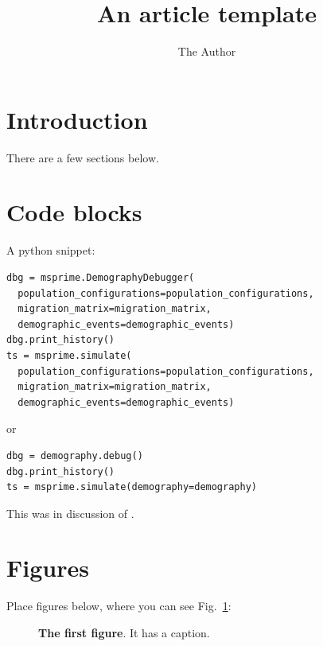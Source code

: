 \documentclass[]{article}
\begin{document}
\title{An article template}
\author[1,*]{The Author}
\maketitle


\section{Introduction}

There are a few sections below.

\lipsum[2-4]

\section{Code blocks}

A python snippet:
\begin{lstlisting}[frame=single]
dbg = msprime.DemographyDebugger(
  population_configurations=population_configurations,
  migration_matrix=migration_matrix,
  demographic_events=demographic_events)
dbg.print_history()
ts = msprime.simulate(
  population_configurations=population_configurations,
  migration_matrix=migration_matrix,
  demographic_events=demographic_events)
\end{lstlisting}
or
\begin{lstlisting}[frame=single]
dbg = demography.debug()
dbg.print_history()
ts = msprime.simulate(demography=demography)
\end{lstlisting}

This was in discussion of \citet{kelleher2016efficient}.
\section{Figures}

Place figures below, where you can see Fig.~\ref{fig:1}:

\begin{figure}[ht]
\begin{center}
\caption{\textbf{The first figure}.
    It has a caption.
}
\label{fig:1}
\end{center}
\end{figure}
\end{document}
